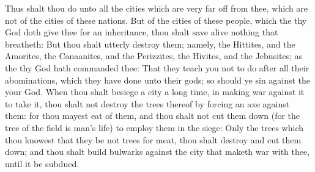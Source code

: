 \begin{biblechapter}
\verse Thus shalt thou do unto all the cities which are very far off from thee, which are not of the cities of these nations.
\verse But of the cities of these people, which the \LORD thy God doth give thee for an inheritance, thou shalt save alive nothing that breatheth:
\verse But thou shalt utterly destroy them; namely, the Hittites, and the Amorites, the Canaanites, and the Perizzites, the Hivites, and the Jebusites; as the \LORD thy God hath commanded thee:
\verse That they teach you not to do after all their abominations, which they have done unto their gods; so should ye sin against the \LORD your God.
\verse When thou shalt besiege a city a long time, in making war against it to take it, thou shalt not destroy the trees thereof by forcing an axe against them: for thou mayest eat of them, and thou shalt not cut them down (for the tree of the field is man's life) to employ them in the siege:
\verse Only the trees which thou knowest that they be not trees for meat, thou shalt destroy and cut them down; and thou shalt build bulwarks against the city that maketh war with thee, until it be subdued.
\end{biblechapter}

